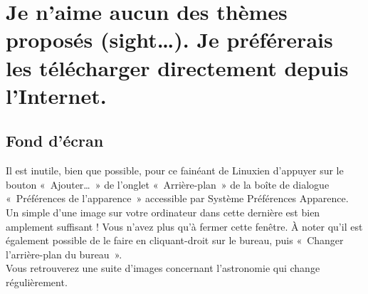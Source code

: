 \section{Je n'aime aucun des thèmes proposés (sight\ldots{}). Je préférerais les télécharger directement depuis l'Internet.}
\subsection{Fond d'écran}
Il est inutile, bien que possible, pour ce fainéant de Linuxien d'appuyer sur le bouton «~Ajouter\ldots{}~» de l'onglet «~Arrière-plan~» de la boîte de dialogue «~Préférences de l'apparence~» accessible par Système \FlecheDroite Préférences \FlecheDroite Apparence. Un simple  d'une image sur votre ordinateur dans cette dernière est bien amplement suffisant ! Vous n'avez plus qu'à fermer cette fenêtre. À noter qu'il est également possible de le faire en cliquant-droit sur le bureau, puis «~Changer l'arrière-plan du bureau~».\\
Vous retrouverez une suite d'images concernant l'astronomie qui change régulièrement.
